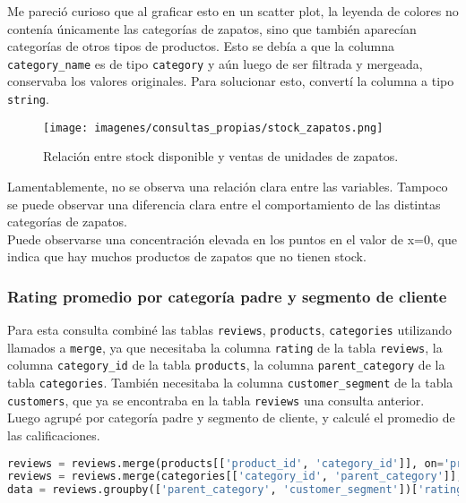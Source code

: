 Me pareció curioso que al graficar esto en un scatter plot, la leyenda de colores no contenía únicamente las categorías de zapatos, sino que también aparecían categorías de otros tipos de productos. Esto se debía a que la columna \texttt{category\_name} es de tipo \texttt{category} y aún luego de ser filtrada y mergeada, conservaba los valores originales. Para solucionar esto, convertí la columna a tipo \texttt{string}.

\begin{figure}[H]
    \centering
    \texttt{[image: imagenes/consultas\_propias/stock\_zapatos.png]}
    \caption{Relación entre stock disponible y ventas de unidades de zapatos.}
    \label{fig:stock_vs_ventas}
\end{figure}

Lamentablemente, no se observa una relación clara entre las variables. Tampoco se puede observar una diferencia clara entre el comportamiento de las distintas categorías de zapatos.\\
Puede observarse una concentración elevada en los puntos en el valor de x=0, que indica que hay muchos productos de zapatos que no tienen stock.

\subsubsection{Rating promedio por categoría padre y segmento de cliente}

Para esta consulta combiné las tablas \texttt{reviews}, \texttt{products}, \texttt{categories} utilizando llamados a \texttt{merge}, ya que necesitaba la columna \texttt{rating} de la tabla \texttt{reviews}, la columna \texttt{category\_id} de la tabla \texttt{products}, la columna \texttt{parent\_category} de la tabla \texttt{categories}. También necesitaba la columna \texttt{customer\_segment} de la tabla \texttt{customers}, que ya se encontraba en la tabla \texttt{reviews} una consulta anterior.\\
Luego agrupé por categoría padre y segmento de cliente, y calculé el promedio de las calificaciones.
\begin{lstlisting}[language=Python, xleftmargin=20pt, xrightmargin=20pt]
reviews = reviews.merge(products[['product_id', 'category_id']], on='product_id', how='left')
reviews = reviews.merge(categories[['category_id', 'parent_category']], on='category_id', how='left')
data = reviews.groupby(['parent_category', 'customer_segment'])['rating'].mean().unstack()
\end{lstlisting}


